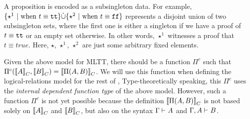 \newcommand{\Glued}[1]{\ensuremath{{#1}^\bullet}}
\newcommand{\GluedPi}[2]{\ensuremath{\Pi^\bullet({#1},{#2})}}
\newcommand{\GSubstExt}[2]{\ensuremath{{#1},^\bullet{#2}}}
\newcommand{\Gpair}[2]{\ensuremath{({#1},^\bullet{#2})}}
\newcommand{\Gfst}[1]{\ensuremath{\texttt{fst}^\bullet~{#1}}}
\newcommand{\Gsnd}[1]{\ensuremath{\texttt{snd}^\bullet~{#1}}}
\newcommand{\Gsub}[2]{\ensuremath{{#1}\!\left[{#2}\right]^\bullet}}
\newcommand{\Glam}[1]{\ensuremath{\lambda^\bullet({#1})}}
\newcommand{\Gapp}[1]{\ensuremath{\texttt{app}^\bullet({#1})}}
\newcommand{\GSubstWeak}[1]{\ensuremath{(\texttt{p}^\bullet)^{#1}}}
\newcommand{\GLSigAdd}[3]{\ensuremath{\nu^{+\bullet}({#1},{#2},{#3})}}
\newcommand{\GCaseSig}[3]{\ensuremath{\texttt{CaseTy}^\bullet({#1},{#2},{#3})}}
\newcommand{\Gmodel}[1]{\ensuremath{{({#1})}^c}}
\newcommand{\GEl}[1]{\ensuremath{\Glued{\texttt{El}}({#1})}}
\newcommand{\Gwcode}[1]{\ensuremath{\Glued{\texttt{W}}({#1})}}
\newcommand{\GSubstId}{\ensuremath{\GSubstWeak{0}}}
\newcommand{\Gwsigproj}[3]{\ensuremath{\Glued{{\texttt{w}\pi^{#1}_{\texttt{#2}}}}({#3})}}
\newcommand{\GRecproj}[2]{\ensuremath{\Glued{{\texttt{R}\pi^{#1}}}({#2})}}



A proposition is encoded as a subsingleton data. For
example, $\{\star^1 \ | \text{ when } t \equiv \texttt{tt}  \} \dot{\cup} \{\star^2 \
| \text{ when } t \equiv \texttt{ff}  \}$ represents a disjoint union of two
subsingleton sets, where the first one is either a singleton if we have a proof of
$t \equiv \texttt{tt}$ or an empty set otherwise.
In other words,
$\star^1$ witnesses a proof that $t \equiv true$.
Here, $\star$, $\star^1$, $\star^2$ are just some arbitrary fixed elements.  


Given the above model for MLTT, there should be a function ${\Pi}^c$ such
that ${\Pi}^c({{\llbracket {A} \rrbracket}_C},{{\llbracket {B} \rrbracket}_C}) = {\llbracket {\ensuremath{\Pi({A},{B})}} \rrbracket}_C$. We will
use this function when defining the logical-relations model for the rest of \TT,
Type-theoretically speaking, this ${\Pi}^c$ uses the \emph{internal dependent
function type} of
the above model.
However, such a function $\Pi^c$ is not yet possible because the definition
${\llbracket {\ensuremath{\Pi({A},{B})}} \rrbracket}_C$ is not based solely on ${\llbracket {A} \rrbracket}_C$ and
${\llbracket {B} \rrbracket}_C$,
but also on the syntax $ {\Gamma} \vdash_{} {A} $ and $ {\Gamma, A} \vdash_{} {B} $. 

